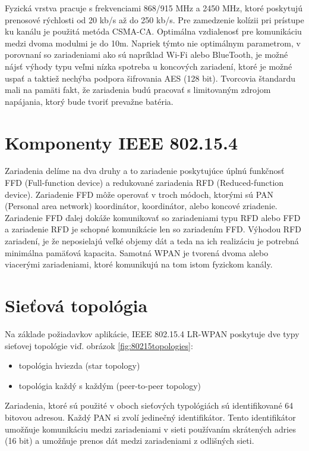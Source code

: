 \documentclass[11pt,twoside,a4paper]{book}
\begin{document}
Fyzická vrstva pracuje s frekvenciami 868/915 MHz a 2450 MHz, ktoré poskytujú prenosové rýchlosti od 20 kb/s až do 250 kb/s. Pre zamedzenie kolízii pri prístupe ku kanálu je použitá metóda CSMA-CA. Optimálna vzdialenosť pre komunikáciu medzi dvoma modulmi je do 10m. Napriek týmto nie optimálnym parametrom, v porovnaní so zariadeniami ako sú napríklad Wi-Fi alebo BlueTooth, je možné nájsť výhody typu veľmi nízka spotreba u koncových zariadení, ktoré je možné uspať a taktiež nechýba podpora šifrovania AES (128 bit). Tvorcovia štandardu mali na pamäti fakt, že zariadenia budú pracovať s limitovaným zdrojom napájania, ktorý bude tvoriť prevažne batéria.
	
\section{Komponenty IEEE 802.15.4}
Zariadenia delíme na dva druhy a to zariadenie poskytujúce úplnú funkčnosť FFD (Full-function device) a redukované zariadenia RFD (Reduced-function device). Zariadenie FFD môže operovať v troch módoch, ktorými sú PAN (Personal area network) koordinátor, koordinátor, alebo koncové zriadenie. Zariadenie FFD ďalej dokáže komunikovať so zariadeniami typu RFD alebo FFD a zariadenie RFD je schopné komunikácie len so zariadením FFD. Výhodou RFD zariadení, je že neposielajú veľké objemy dát a teda na ich realizáciu je potrebná minimálna pamäťová kapacita. 
Samotná WPAN je tvorená dvoma alebo viacerými zariadeniami, ktoré komunikujú na tom istom fyzickom kanály.

\newpage 

\section{Sieťová topológia}
Na základe požiadavkov aplikácie, IEEE 802.15.4 LR-WPAN poskytuje dve typy sieťovej topológie viď. obrázok \ref{fig:80215topologies}:
\begin{itemize}
\item topológia hviezda (star topology)
\item topológia každý s každým (peer-to-peer topology)
\end{itemize}

Zariadenia, ktoré sú použité v oboch sieťových typológiách sú identifikované 64 bitovou adresou. Každý PAN si zvolí jedinečný identifikátor. Tento identifikátor umožňuje komunikáciu medzi zariadeniami v sieti používaním skrátených adries (16 bit) a umožňuje prenos dát medzi zariadeniami z odlišných sieti.
\end{document}
